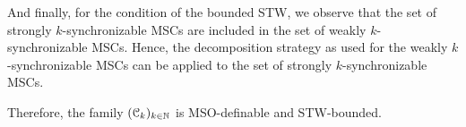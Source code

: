 
And finally, for the condition of the bounded STW, we observe that the set of strongly $k$-synchronizable MSCs are included in the set of weakly $k$-synchronizable MSCs. Hence, the decomposition strategy as used for the weakly $k$-synchronizable MSCs can be applied to the set of strongly $k$-synchronizable MSCs.

Therefore, the family $(\mathcal{C}_k)_{k \in \mathbb{N}}$ is MSO-definable and STW-bounded.
